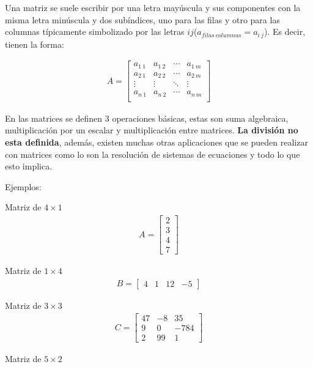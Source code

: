 Una matriz se suele escribir por una letra mayúscula y sus componentes con la
misma letra minúscula y dos subíndices, uno para las filas y otro para las
columnas típicamente simbolizado por las letras $ij$($a_{filas\ columnas}=
a_{i\ j}$). Es decir, tienen la forma:

\begin{align*}
    A =
    \begin{bmatrix}
        a_{1\ 1} & a_{1\ 2} & \cdots & a_{1\ m}\\
        a_{2\ 1} & a_{2\ 2} & \cdots & a_{2\ m}\\
        \vdots & \vdots & \ddots & \vdots\\
        a_{n\ 1} & a_{n\ 2} & \cdots & a_{n\ m}\\
    \end{bmatrix}
\end{align*}


En las matrices se definen 3 operaciones básicas, estas son suma algebraica,
multiplicación por un escalar y multiplicación entre matrices. \textbf{La división
no esta definida}, además, existen muchas otras aplicaciones que se pueden
realizar con matrices como lo son la resolución de sistemas de ecuaciones y
todo lo que esto implica.


Ejemplos:

Matriz de $ 4\times1 $
\begin{align*}
    A =
    \begin{bmatrix}
        2 \\
        3\\
        4\\
        7
    \end{bmatrix}
\end{align*}


Matriz de $1\times4 $
\begin{align*}
    B =
    \begin{bmatrix}
        4 & 1 & 12 & -5
    \end{bmatrix}
\end{align*}

Matriz de $3\times3$
\begin{align*}
    C =
    \begin{bmatrix}
        47 & -8 & 35\\
        9 & 0 & -784 \\
        2 & 99 & 1
    \end{bmatrix}
\end{align*}


Matriz de $ 5\times2 $

